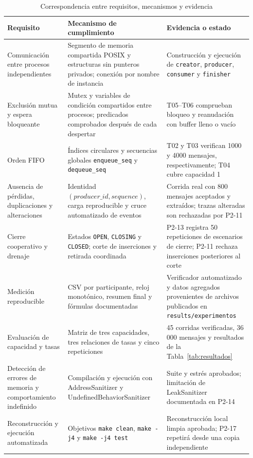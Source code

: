 \documentclass[conference]{IEEEtran}
\begin{document}
\begin{table}[htbp]
\caption{Correspondencia entre requisitos, mecanismos y evidencia}\label{tab:trazabilidad}
\centering\footnotesize
\begin{tabular}{p{}p{}p{}}
\toprule
Requisito & Mecanismo de cumplimiento & Evidencia o estado \\
\midrule
Comunicación entre procesos independientes & Segmento de memoria compartida POSIX y estructuras sin punteros privados; conexión por nombre de instancia & Construcción y ejecución de \texttt{creator}, \texttt{producer}, \texttt{consumer} y \texttt{finisher} \\
Exclusión mutua y espera bloqueante & Mutex y variables de condición compartidos entre procesos; predicados comprobados después de cada despertar & T05--T06 comprueban bloqueo y reanudación con buffer lleno o vacío \\
Orden FIFO & Índices circulares y secuencias globales \texttt{enqueue\_seq} y \texttt{dequeue\_seq} & T02 y T03 verifican 1000 y 4000 mensajes, respectivamente; T04 cubre capacidad 1 \\
Ausencia de pérdidas, duplicaciones y alteraciones & Identidad $(\textit{producer\_id},\textit{sequence})$, carga reproducible y cruce automatizado de eventos & Corrida real con 800 mensajes aceptados y extraídos; trazas alteradas son rechazadas por P2-11 \\
Cierre cooperativo y drenaje & Estados \texttt{OPEN}, \texttt{CLOSING} y \texttt{CLOSED}; corte de inserciones y retirada coordinada & P2-13 registra 50 repeticiones de escenarios de cierre; P2-11 rechaza inserciones posteriores al corte \\
Medición reproducible & CSV por participante, reloj monotónico, resumen final y fórmulas documentadas & Verificador automatizado y datos agregados provenientes de archivos publicados en \texttt{results/experimentos} \\
Evaluación de capacidad y tasas & Matriz de tres capacidades, tres relaciones de tasas y cinco repeticiones & 45 corridas verificadas, 36\,000 mensajes y resultados de la Tabla~\ref{tab:resultados} \\
Detección de errores de memoria y comportamiento indefinido & Compilación y ejecución con AddressSanitizer y UndefinedBehaviorSanitizer & Suite y estrés aprobados; limitación de LeakSanitizer documentada en P2-14 \\
Reconstrucción y ejecución automatizada & Objetivos \texttt{make clean}, \texttt{make -j4} y \texttt{make -j4 test} & Reconstrucción local limpia aprobada; P2-17 repetirá desde una copia independiente \\
\bottomrule
\end{tabular}
\end{table}
\end{document}
